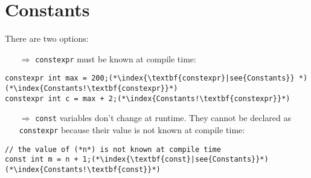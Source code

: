 \documentclass[10pt]{article}
\begin{document}
\section{Constants}
\small
There are two options:
\begin{enumerate}
\item[$\Rightarrow$] \texttt{constexpr} must be known at compile time:
\end{enumerate}
\begin{lstlisting}
constexpr int max = 200;(*\index{\textbf{constexpr}|see{Constants}} *)(*\index{Constants!\textbf{constexpr}}*)
constexpr int c = max + 2;(*\index{Constants!\textbf{constexpr}}*)
\end{lstlisting}
\begin{enumerate}
\item[$\Rightarrow$] \texttt{const} variables don't change at runtime. They cannot be declared as
\texttt{constexpr} because their value is not known at compile time:
\end{enumerate}
\begin{lstlisting}
// the value of (*n*) is not known at compile time
const int m = n + 1;(*\index{\textbf{const}|see{Constants}}*)(*\index{Constants!\textbf{const}}*)
\end{lstlisting}
%
%
\end{document}
